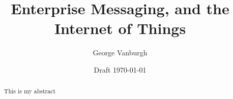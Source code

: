 \documentclass[a4paper,12pt,titlepage]{report}
\title{Enterprise Messaging, and the Internet of Things}
\author{George Vanburgh}
\date{Draft \today}
\begin{document}
  \maketitle

  \begin{abstract}
    This is my abstract
  \end{abstract}

  \tableofcontents
\end{document}
